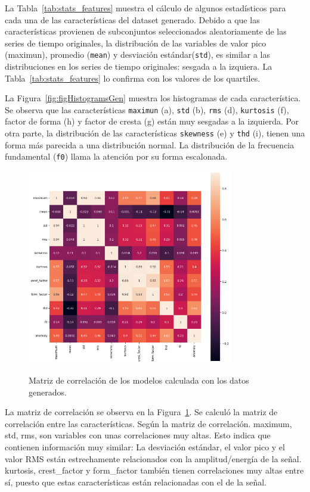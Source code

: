 \documentclass[11pt,a4paper,spanish]{book}
\numberwithin{equation}{chapter}
\numberwithin{figure}{chapter}
\begin{document}
La Tabla~\ref{tab:stats_features} muestra el cálculo de algunos estadísticos para cada
una de las características del dataset generado. 
Debido a que las características provienen de  subconjuntos seleccionados aleatoriamente 
de las series de tiempo originales, la distribución de las variables de valor pico (maximun), 
promedio (\texttt{mean}) y desviación estándar(\texttt{std}), 
es similar  a las distribuciones en los series 
de tiempo originales: sesgada a la izquiera. La Tabla~\ref{tab:stats_features} lo confirma
con los valores de los quartiles. 


La Figura~\ref{fig:figHistogramsGen} muestra los histogramas de cada característica. 
Se observa que las características \texttt{maximun} (a), \texttt{std} (b), \texttt{rms} (d), 
\texttt{kurtosis} (f), 
factor de forma (h) y factor de cresta (g) están muy sesgadas a la izquierda. 
Por otra parte, la distribución de las características  \texttt{skewness} (e) y \texttt{thd} (i), 
tienen una forma más parecida a una distribución normal.
La distribución de la frecuencia fundamental (\texttt{f0}) llama la atención por su forma escalonada. 


\begin{figure}[h]
    \caption{Matriz de correlación de los modelos calculada con los datos generados.}
    \centering
    \includegraphics[width=0.8\textwidth]{media/dataset-04/corr-mat.png}
    \label{fig:figMatrixCorrelationDT4}
\end{figure}


La matriz de correlación se observa en la Figura~\ref{fig:figMatrixCorrelationDT4}. 
Se calculó la matriz de correlación entre las características. Según la matriz de correlación. 
maximum, std, rms, son variables con unas correlaciones muy altas. Esto indica que contienen
información muy similar: La desviación estándar, el valor pico y el valor RMS están 
estrechamente relacionados con la amplitud/energía de la señal. kurtosis, crest\_factor y
form\_factor también tienen correlaciones muy altas entre sí, puesto que estas características
están relacionadas con el  de la señal. 
\end{document}
